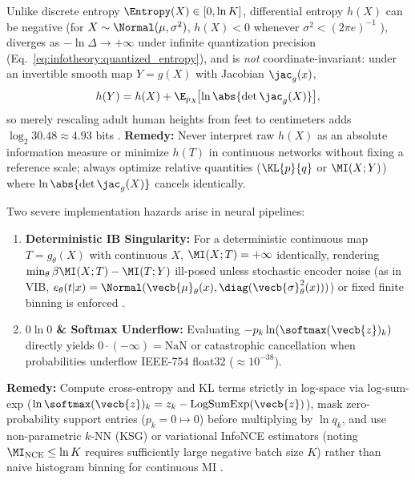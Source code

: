 \documentclass[../../../../master.tex]{subfiles}
\begin{document}
\begin{pitfall}
\label{pit:infotheory:diff_entropy}
Unlike discrete entropy $\Entropy(X) \in [0, \ln K]$, differential entropy $h(X)$ can be negative (for $X \sim \Normal(\mu, \sigma^2)$, $h(X) < 0$ whenever $\sigma^2 < (2\pi e)^{-1}$ ), diverges as $-\ln\Delta \to +\infty$ under infinite quantization precision (Eq.~\eqref{eq:infotheory:quantized_entropy}), and is \emph{not} coordinate-invariant: under an invertible smooth map $Y = g(X)$ with Jacobian $\jac_g(x)$,
\begin{equation}
\label{eq:infotheory:diff_entropy_jacobian}
  h(Y) = h(X) + \E_{p_X}\!\bigl[\ln\abs{\det \jac_g(X)}\bigr],
\end{equation}
so merely rescaling adult human heights from feet to centimeters adds $\log_2 30.48 \approx 4.93$ bits .
\textbf{Remedy:} Never interpret raw $h(X)$ as an absolute information measure or minimize $h(T)$ in continuous networks without fixing a reference scale; always optimize relative quantities ($\KL{p}{q}$ or $\MI(X;Y)$) where $\ln\abs{\det \jac_g(X)}$ cancels identically.
\end{pitfall}

\begin{pitfall}
\label{pit:infotheory:numerical}
Two severe implementation hazards arise in neural pipelines:
\begin{enumerate}[leftmargin=1.4em]
  \item \textbf{Deterministic IB Singularity:} For a deterministic continuous map $T = g_\theta(X)$ with continuous $X$, $\MI(X; T) = +\infty$ identically, rendering $\min_\theta \beta\MI(X; T) - \MI(T; Y)$ ill-posed unless stochastic encoder noise (as in VIB, $e_\theta(t|x) = \Normal(\vecb{\mu}_\theta(x), \diag(\vecb{\sigma}^2_\theta(x)))$) or fixed finite binning is enforced .
  \item \textbf{$0\ln 0$ \& Softmax Underflow:} Evaluating $-p_k \ln(\softmax(\vecb{z})_k)$ directly yields $0 \cdot (-\infty) = \mathrm{NaN}$ or catastrophic cancellation when probabilities underflow IEEE-754 float32 ($\approx 10^{-38}$).
\end{enumerate}
\textbf{Remedy:} Compute cross-entropy and KL terms strictly in log-space via log-sum-exp ($\ln\softmax(\vecb{z})_k = z_k - \text{LogSumExp}(\vecb{z})$), mask zero-probability support entries ($p_k = 0 \mapsto 0$) before multiplying by $\ln q_k$, and use non-parametric $k$-NN (KSG) or variational InfoNCE estimators (noting $\MI_{\mathrm{NCE}} \le \ln K$ requires sufficiently large negative batch size $K$) rather than naive histogram binning for continuous MI  .
\end{pitfall}
\end{document}
